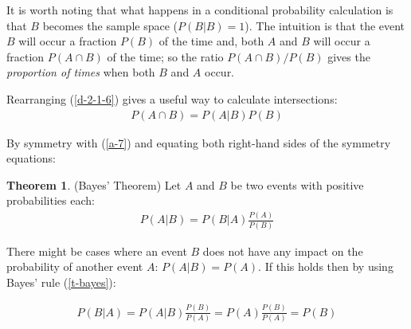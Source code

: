 \documentclass[
  oneside,
  11pt, a4paper,
  footinclude=true,
  headinclude=true,
  cleardoublepage=empty
]{scrbook}
\theoremstyle{definition}
\theoremstyle{definition}
\newtheorem{theorem}{Theorem}[section]
\begin{document}
        It is worth noting that what happens in a conditional probability calculation is that $B$ becomes the sample space ($P(B|B) = 1$). The intuition is that the event $B$ will occur a fraction $P(B)$ of the time and, both $A$ and $B$ will occur a fraction $P(A \cap B)$ of the time; so the ratio $P(A \cap B)/P(B)$ gives the \emph{proportion of times} when both $B$ and $A$ occur.
        
        Rearranging (\ref{d-2-1-6}) gives a useful way to calculate intersections:
        \begin{align}\label{a-7}
           P(A \cap B) = P(A|B)P(B) 
        \end{align}{}
        
        By symmetry with (\ref{a-7}) and equating both right-hand sides of the symmetry equations:
        
        \begin{theorem}{(Bayes' Theorem) Let $A$ and $B$ be two events with positive probabilities each:}
            \begin{align}\label{t-bayes}
                P(A|B) = P(B|A)\frac{P(A)}{P(B)}
            \end{align}{}
        \end{theorem}{}
        
        There might be cases where an event $B$ does not have any impact on the probability of another event $A$: $P(A|B) = P(A)$. If this holds then by using Bayes' rule (\ref{t-bayes}):
        
        \begin{align*}
            P(B|A) = P(A|B)\frac{P(B)}{P(A)} = P(A)\frac{P(B)}{P(A)} = P(B)
        \end{align*}{}
        
        
        
        
\end{document}
